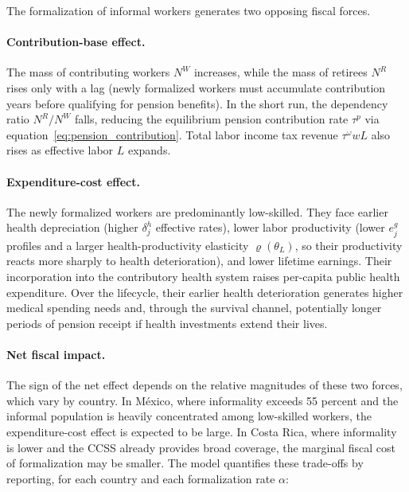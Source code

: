\documentclass[12pt,a4paper]{article}
\begin{document}
The formalization of informal workers generates two opposing fiscal forces.

\paragraph{Contribution-base effect.} The mass of contributing workers $N^W$ increases, while the mass of retirees $N^R$ rises only with a lag (newly formalized workers must accumulate contribution years before qualifying for pension benefits). In the short run, the dependency ratio $N^R/N^W$ falls, reducing the equilibrium pension contribution rate $\tau^p$ via equation~\eqref{eq:pension_contribution}. Total labor income tax revenue $\tau^\omega w L$ also rises as effective labor $L$ expands.

\paragraph{Expenditure-cost effect.} The newly formalized workers are predominantly low-skilled. They face earlier health depreciation (higher $\delta_j^h$ effective rates), lower labor productivity (lower $e^g_j$ profiles and a larger health-productivity elasticity $\varrho(\theta_L)$, so their productivity reacts more sharply to health deterioration), and lower lifetime earnings. Their incorporation into the contributory health system raises per-capita public health expenditure. Over the lifecycle, their earlier health deterioration generates higher medical spending needs and, through the survival channel, potentially longer periods of pension receipt if health investments extend their lives.

\paragraph{Net fiscal impact.} The sign of the net effect depends on the relative magnitudes of these two forces, which vary by country. In M\'exico, where informality exceeds 55 percent and the informal population is heavily concentrated among low-skilled workers, the expenditure-cost effect is expected to be large. In Costa Rica, where informality is lower and the CCSS already provides broad coverage, the marginal fiscal cost of formalization may be smaller. The model quantifies these trade-offs by reporting, for each country and each formalization rate $\alpha$:
\end{document}
